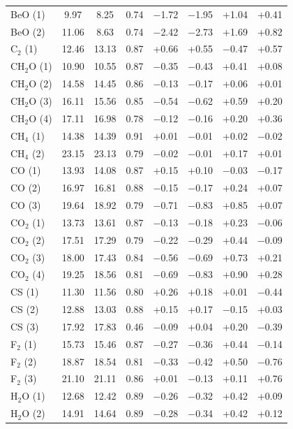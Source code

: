\documentclass[aip,jcp,reprint,noshowkeys,superscriptaddress]{revtex4-1}
\begin{document}
\begin{table}[hbt!]
\begin{tabular}{lccccccc}
BeO (1) & 9.97 & 8.25 & 0.74 & $-$1.72 & $-$1.95 & +1.04 & +0.41 \\
BeO (2) & 11.06 & 8.63 & 0.74 & $-$2.42 & $-$2.73 & +1.69 & +0.82 \\
C$_2$ (1) & 12.46 & 13.13 & 0.87 & +0.66 & +0.55 & $-$0.47 & +0.57 \\
CH$_2$O (1) & 10.90 & 10.55 & 0.87 & $-$0.35 & $-$0.43 & +0.41 & +0.08 \\
CH$_2$O (2) & 14.58 & 14.45 & 0.86 & $-$0.13 & $-$0.17 & +0.06 & +0.01 \\
CH$_2$O (3) & 16.11 & 15.56 & 0.85 & $-$0.54 & $-$0.62 & +0.59 & +0.20 \\
CH$_2$O (4) & 17.11 & 16.98 & 0.78 & $-$0.12 & $-$0.16 & +0.20 & +0.36 \\
CH$_4$ (1) & 14.38 & 14.39 & 0.91 & +0.01 & $-$0.01 & +0.02 & $-$0.02 \\
CH$_4$ (2) & 23.15 & 23.13 & 0.79 & $-$0.02 & $-$0.01 & +0.17 & +0.01 \\
CO (1) & 13.93 & 14.08 & 0.87 & +0.15 & +0.10 & $-$0.03 & $-$0.17 \\
CO (2) & 16.97 & 16.81 & 0.88 & $-$0.15 & $-$0.17 & +0.24 & +0.07 \\
CO (3) & 19.64 & 18.92 & 0.79 & $-$0.71 & $-$0.83 & +0.85 & +0.07 \\
CO$_2$ (1) & 13.73 & 13.61 & 0.87 & $-$0.13 & $-$0.18 & +0.23 & $-$0.06 \\
CO$_2$ (2) & 17.51 & 17.29 & 0.79 & $-$0.22 & $-$0.29 & +0.44 & $-$0.09 \\
CO$_2$ (3) & 18.00 & 17.43 & 0.84 & $-$0.56 & $-$0.69 & +0.73 & +0.21 \\
CO$_2$ (4) & 19.25 & 18.56 & 0.81 & $-$0.69 & $-$0.83 & +0.90 & +0.28 \\
CS (1) & 11.30 & 11.56 & 0.80 & +0.26 & +0.18 & +0.01 & $-$0.44 \\
CS (2) & 12.88 & 13.03 & 0.88 & +0.15 & +0.17 & $-$0.15 & +0.03 \\
CS (3) & 17.92 & 17.83 & 0.46 & $-$0.09 & +0.04 & +0.20 & $-$0.39 \\
F$_2$ (1) & 15.73 & 15.46 & 0.87 & $-$0.27 & $-$0.36 & +0.44 & $-$0.14 \\
F$_2$ (2) & 18.87 & 18.54 & 0.81 & $-$0.33 & $-$0.42 & +0.50 & $-$0.76 \\
F$_2$ (3) & 21.10 & 21.11 & 0.86 & +0.01 & $-$0.13 & +0.11 & +0.76 \\
H$_2$O (1) & 12.68 & 12.42 & 0.89 & $-$0.26 & $-$0.32 & +0.42 & +0.09 \\
H$_2$O (2) & 14.91 & 14.64 & 0.89 & $-$0.28 & $-$0.34 & +0.42 & +0.12 \\

\end{tabular}
\end{table}
\end{document}
